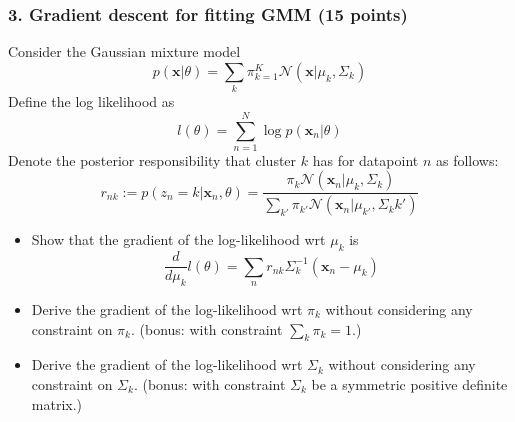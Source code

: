 \documentclass[12pt]{article}%
\begin{document}
\newpage


\subsubsection*{3. Gradient descent for fitting GMM (15 points)}
Consider the Gaussian mixture model
\[p(\mathbf{x}|\theta)=\sum_k \pi_{k=1}^K \mathcal{N}(\mathbf{x}|\mu_k,\Sigma_k)\]
Define the log likelihood as
\[ l(\theta) = \sum_{n=1}^N \log p(\mathbf{x}_n|\theta)
\]
Denote the posterior responsibility that cluster $k$ has for datapoint $n$ as follows:
\[
r_{nk}:=p(z_n=k|\mathbf{x}_n,\theta) = \frac{\pi_k\mathcal{N}(\mathbf{x}_n|\mu_k,\Sigma_k)}{\sum_{k'}\pi_{k'}\mathcal{N}(\mathbf{x}_n|\mu_{k'},\Sigma_k{k'})}
\]

\begin{itemize}
	
	\item Show that the gradient of the log-likelihood wrt $\mu_k$ is
	\[ \frac{d}{d\mu_k}l(\theta) = \sum_n r_{nk}\Sigma_k^{-1}(\mathbf{x}_n-\mu_k)
	\]
    \item Derive the gradient of the log-likelihood wrt $\pi_k$ without considering any constraint on $\pi_k$. (bonus: with constraint $\sum_k\pi_k=1$.)
    \item Derive the gradient of the log-likelihood wrt $\Sigma_k$ without considering any constraint on $\Sigma_k$. (bonus: with constraint $\Sigma_k$ be a symmetric positive definite matrix.) 
	
\end{itemize}
\end{document}
